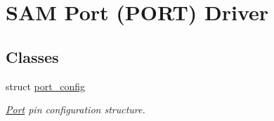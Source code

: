 \hypertarget{group__asfdoc__sam0__port__group}{}\section{S\+A\+M Port (P\+O\+R\+T) Driver}
\label{group__asfdoc__sam0__port__group}
\subsection*{Classes}
\begin{DoxyCompactItemize}
\item 
struct \hyperlink{structport__config}{port\+\_\+config}
\begin{DoxyCompactList}\small\item\em \hyperlink{struct_port}{Port} pin configuration structure. \end{DoxyCompactList}\end{DoxyCompactItemize}
